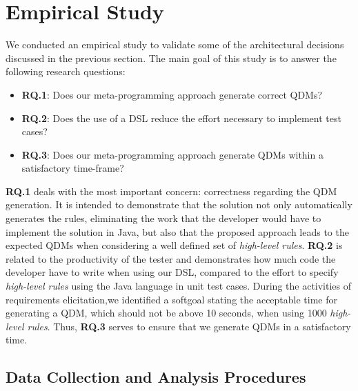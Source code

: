 \documentclass[twocolumn]{bmcart}%
\newcommand{\callers}{\emph{high-level rules}\xspace}
\begin{document}
\section{Empirical Study}
\label{sec:case_study} 

We conducted an empirical study to validate some
of the architectural decisions discussed in the previous
section. The main goal of this study is to answer
the following research questions:

\begin{itemize}
	\item \textbf{RQ.1}: Does our meta-programming approach generate correct QDMs?
	\item \textbf{RQ.2}: Does the use of a DSL reduce the effort necessary to implement test cases?
          
	\item \textbf{RQ.3}: Does our meta-programming approach generate QDMs within a satisfactory time-frame?
\end{itemize}

\textbf{RQ.1} deals with the most important concern: correctness regarding the QDM generation. It is intended to demonstrate that the solution not only automatically generates the rules, eliminating the work that the developer would have to implement the solution in Java, but also that the proposed approach leads to the expected QDMs when considering a well defined set of \callers. \textbf{RQ.2} is related to the productivity of the tester and demonstrates how much code the developer have to write when using our DSL, compared to the effort to specify \callers using the Java language in unit test cases. During the activities of requirements elicitation,we identified a softgoal stating the  acceptable time for generating a QDM, which should not be above 10 seconds, when using 1000 \callers. Thus, \textbf{RQ.3} serves to ensure that we generate QDMs in a satisfactory time.



\subsection{Data Collection and Analysis Procedures}
\end{document}
